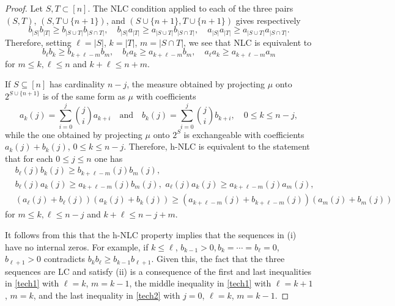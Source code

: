 \documentclass[10pt,reqno]{amsart}
\theoremstyle{plain}
\theoremstyle{definition}
\theoremstyle{remark}
\begin{document}
\begin{proof}
Let $S,T\subset [n]$. The NLC condition applied to each of the three pairs
$(S,T)$, $(S,T\cup\{n+1\})$, and $(S\cup\{n+1\},T\cup\{n+1\})$ gives  
respectively
$$b_{|S|}b_{|T|}\geq b_{|S\cup T|}b_{|S\cap T|},\quad b_{|S|}a_{|T|} 
\geq a_{|S\cup T|}b_{|S\cap T|},
\quad a_{|S|}a_{|T|}\geq a_{|S\cup T|}a_{|S\cap T|}.$$
Therefore, setting $\ell=|S|$, $k=|T|$, $m=|S\cap T|$, we see that 
NLC is  equivalent to
\begin{equation}\label{tech1}
b_\ell b_k\geq b_{k+\ell-m}b_m,\quad b_\ell a_k\geq a_{k+\ell-m}b_m,\quad 
a_\ell a_k \geq a_{k+\ell-m}a_m
\end{equation}
for $m\leq k,\ell\leq n$ and $k+\ell\leq n+m$.

If $S\subseteq [n]$ has cardinality $n-j$, the measure obtained by  
projecting $\mu$ onto $2^{S\cup\{n+1\}}$
is of the same form as $\mu$ with  coefficients
$$a_k(j)=\sum_{i=0}^j\binom jia_{k+i}\quad\text{and}\quad 
b_k(j)=\sum_ {i=0}^j\binom jib_{k+i},
\quad 0\leq k\leq n-j,$$
while the one obtained by projecting $\mu$ onto $2^S$ is exchangeable with  
coefficients $a_k(j)+b_k(j)$, $0\leq k\leq n-j$.
Therefore, h-NLC is equivalent to the statement that for each 
$0 \leq j\leq n$ one has 
\begin{equation}\label{tech2}
\begin{split}
&b_\ell(j)b_k(j)\geq b_{k+\ell-m}(j)b_m(j),\\  
&b_\ell(j)a_k(j)\geq  a_{k+\ell-m}(j)b_m(j),\,\,
a_\ell(j)a_k(j)\geq a_{k+\ell-m}(j)a_m(j),\\
&(a_\ell(j)+b_\ell(j))(a_k(j)+b_k(j))\geq 
(a_{k+\ell-m}(j)+b_{k+\ell-m}(j))(a_m(j) +b_m(j))
\end{split}
\end{equation}
for $m\leq k,\ell\leq n-j$ and $k+\ell\leq n-j+m$.

It follows from this that the h-NLC property implies that the sequences in 
(i) have no internal zeros.
For example, if $k\leq \ell$, $b_{k-1}>0, b_k=\cdots=b_\ell=0$, 
$b_{\ell+1}>0$  contradicts $b_kb_\ell\geq
b_{k-1}b_{\ell+1}$. Given this, the fact that the three sequences are LC  
and satisfy (ii) is
a consequence of the first and last inequalities in \eqref{tech1} with 
$\ell=k$, $m=k-1$, the middle
inequality in \eqref{tech1} with $\ell=k+1$, $m=k$, and the last inequality 
in \eqref{tech2} with $j=0$, $\ell=k$, $m=k-1.$


\end{proof}
\end{document}
